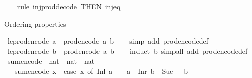 \begin{isabellebody}
%
\isadelimproof
\ \ %
\endisadelimproof
%
\isatagproof
{}\isamarkupfalse%
\ {\isacharparenleft}rule\ inj{\isacharunderscore}prod{\isacharunderscore}decode\ {\isacharbrackleft}THEN\ inj{\isacharunderscore}eq{\isacharbrackright}{\isacharparenright}%
\endisatagproof
{\isafoldproof}%
%
\isadelimproof
%
\endisadelimproof
%
\begin{isamarkuptext}%
Ordering properties%
\end{isamarkuptext}\isamarkuptrue%
\isamarkupfalse%
\ le{\isacharunderscore}prod{\isacharunderscore}encode{\isacharunderscore}{}{\isacharcolon}\ {\isachardoublequoteopen}a\ {\isasymle}\ prod{\isacharunderscore}encode\ {\isacharparenleft}a{\isacharcomma}\ b{\isacharparenright}{\isachardoublequoteclose}\isanewline
%
\isadelimproof
\ \ %
\endisadelimproof
%
\isatagproof
{}\isamarkupfalse%
\ {\isacharparenleft}simp\ add{\isacharcolon}\ prod{\isacharunderscore}encode{\isacharunderscore}def{\isacharparenright}%
\endisatagproof
{\isafoldproof}%
%
\isadelimproof
\isanewline
%
\endisadelimproof
\isanewline
{}\isamarkupfalse%
\ le{\isacharunderscore}prod{\isacharunderscore}encode{\isacharunderscore}{}{\isacharcolon}\ {\isachardoublequoteopen}b\ {\isasymle}\ prod{\isacharunderscore}encode\ {\isacharparenleft}a{\isacharcomma}\ b{\isacharparenright}{\isachardoublequoteclose}\isanewline
%
\isadelimproof
\ \ %
\endisadelimproof
%
\isatagproof
{}\isamarkupfalse%
\ {\isacharparenleft}induct\ b{\isacharparenright}\ {\isacharparenleft}simp{\isacharunderscore}all\ add{\isacharcolon}\ prod{\isacharunderscore}encode{\isacharunderscore}def{\isacharparenright}%
\endisatagproof
{\isafoldproof}%
%
\isadelimproof
%
\endisadelimproof
%
\isadelimdocument
%
\endisadelimdocument
%
\isatagdocument
%
\isamarkuptrue%
%
\endisatagdocument
{\isafolddocument}%
%
\isadelimdocument
%
\endisadelimdocument
{}\isamarkupfalse%
\ sum{\isacharunderscore}encode\ {\isacharcolon}{\isacharcolon}\ {\isachardoublequoteopen}nat\ {\isacharplus}\ nat\ {\isasymRightarrow}\ nat{\isachardoublequoteclose}\isanewline
\ \ \ {\isachardoublequoteopen}sum{\isacharunderscore}encode\ x\ {\isacharequal}\ {\isacharparenleft}case\ x\ of\ Inl\ a\ {\isasymRightarrow}\ {}\ {\isacharasterisk}\ a\ {\isacharbar}\ Inr\ b\ {\isasymRightarrow}\ Suc\ {\isacharparenleft}{}\ {\isacharasterisk}\ b{\isacharparenright}{\isacharparenright}{\isachardoublequoteclose}\isanewline
\isanewline

\end{isabellebody}
